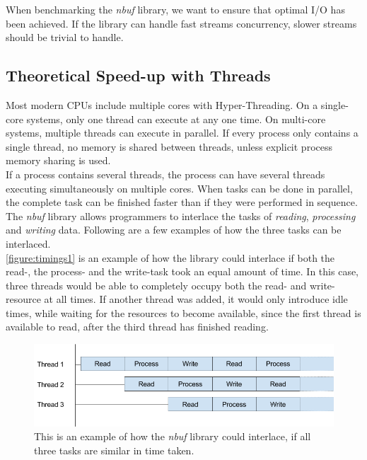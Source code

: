 \documentclass[a4paper]{article}
\newcommand{\nbuf}{\textit{nbuf} }
\begin{document}
When benchmarking the \nbuf library, we want to ensure that optimal I/O has been achieved. If the library can handle fast streams concurrency, slower streams should be trivial to handle.


\subsection{Theoretical Speed-up with Threads}
Most modern CPUs include multiple cores with Hyper-Threading. On a single-core systems, only one thread can execute at any one time. On multi-core systems, multiple threads can execute in parallel. If every process only contains a single thread, no memory is shared between threads, unless explicit process memory sharing is used.\\

If a process contains several threads, the process can have several threads executing simultaneously on multiple cores. When tasks can be done in parallel, the complete task can be finished faster than if they were performed in sequence.\\

The \nbuf library allows programmers to interlace the tasks of \textit{reading}, \textit{processing} and \textit{writing} data. Following are a few examples of how the three tasks can be interlaced.\\

\autoref{figure:timings1} is an example of how the library could interlace if both the read-, the process- and the write-task took an equal amount of time. In this case, three threads would be able to completely occupy both the read- and write-resource at all times. If another thread was added, it would only introduce idle times, while waiting for the resources to become available, since the first thread is available to read, after the third thread has finished reading.\\

\begin{figure}
	\begin{adjustwidth}{-0.5in}{-0.5in}
    \centering
     \includegraphics[scale=0.5]{figures/timings1.png}
  	\caption{This is an example of how the \nbuf library could interlace, if all three tasks are similar in time taken.}
	\label{figure:timings1}
	\end{adjustwidth}
\end{figure}
\end{document}
